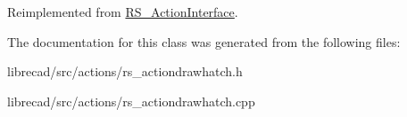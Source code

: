 Reimplemented from \hyperlink{classRS__ActionInterface_a25ec66468e5b09483afccd2358877361}{R\-S\-\_\-\-Action\-Interface}.



The documentation for this class was generated from the following files\-:\begin{DoxyCompactItemize}
\item 
librecad/src/actions/rs\-\_\-actiondrawhatch.\-h\item 
librecad/src/actions/rs\-\_\-actiondrawhatch.\-cpp\end{DoxyCompactItemize}
